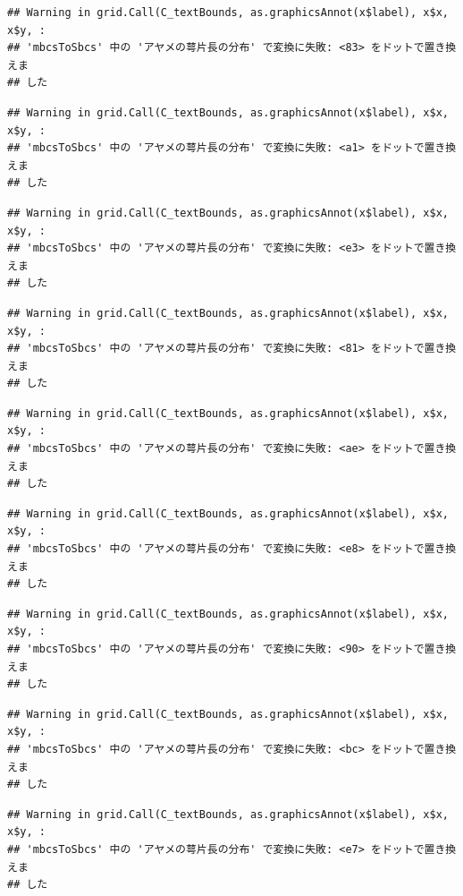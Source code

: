 \documentclass[
]{book}
\begin{document}
\begin{verbatim}
## Warning in grid.Call(C_textBounds, as.graphicsAnnot(x$label), x$x, x$y, :
## 'mbcsToSbcs' 中の 'アヤメの萼片長の分布' で変換に失敗: <83> をドットで置き換えま
## した
\end{verbatim}

\begin{verbatim}
## Warning in grid.Call(C_textBounds, as.graphicsAnnot(x$label), x$x, x$y, :
## 'mbcsToSbcs' 中の 'アヤメの萼片長の分布' で変換に失敗: <a1> をドットで置き換えま
## した
\end{verbatim}

\begin{verbatim}
## Warning in grid.Call(C_textBounds, as.graphicsAnnot(x$label), x$x, x$y, :
## 'mbcsToSbcs' 中の 'アヤメの萼片長の分布' で変換に失敗: <e3> をドットで置き換えま
## した
\end{verbatim}

\begin{verbatim}
## Warning in grid.Call(C_textBounds, as.graphicsAnnot(x$label), x$x, x$y, :
## 'mbcsToSbcs' 中の 'アヤメの萼片長の分布' で変換に失敗: <81> をドットで置き換えま
## した
\end{verbatim}

\begin{verbatim}
## Warning in grid.Call(C_textBounds, as.graphicsAnnot(x$label), x$x, x$y, :
## 'mbcsToSbcs' 中の 'アヤメの萼片長の分布' で変換に失敗: <ae> をドットで置き換えま
## した
\end{verbatim}

\begin{verbatim}
## Warning in grid.Call(C_textBounds, as.graphicsAnnot(x$label), x$x, x$y, :
## 'mbcsToSbcs' 中の 'アヤメの萼片長の分布' で変換に失敗: <e8> をドットで置き換えま
## した
\end{verbatim}

\begin{verbatim}
## Warning in grid.Call(C_textBounds, as.graphicsAnnot(x$label), x$x, x$y, :
## 'mbcsToSbcs' 中の 'アヤメの萼片長の分布' で変換に失敗: <90> をドットで置き換えま
## した
\end{verbatim}

\begin{verbatim}
## Warning in grid.Call(C_textBounds, as.graphicsAnnot(x$label), x$x, x$y, :
## 'mbcsToSbcs' 中の 'アヤメの萼片長の分布' で変換に失敗: <bc> をドットで置き換えま
## した
\end{verbatim}

\begin{verbatim}
## Warning in grid.Call(C_textBounds, as.graphicsAnnot(x$label), x$x, x$y, :
## 'mbcsToSbcs' 中の 'アヤメの萼片長の分布' で変換に失敗: <e7> をドットで置き換えま
## した
\end{verbatim}
\end{document}
